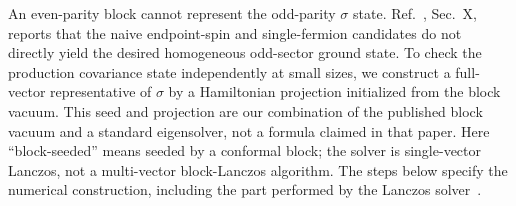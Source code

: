 \label{sec:sigmamethod}
An even-parity block cannot represent the odd-parity $\sigma$ state.
Ref.~\cite{Montes2017}, Sec.~X, reports that the naive endpoint-spin and
single-fermion candidates do not directly yield the desired homogeneous
odd-sector ground state. To check the production covariance state
independently at small sizes, we construct a full-vector representative
of $\sigma$ by a Hamiltonian projection initialized from the block vacuum.
This seed and projection are our combination of the published block
vacuum and a standard eigensolver, not a formula claimed in that paper.
Here ``block-seeded'' means seeded by a conformal block; the solver is
single-vector Lanczos, not a multi-vector block-Lanczos algorithm.
The steps below specify the numerical construction, including the part
performed by the Lanczos solver~\cite{ARPACK,ScipyEigsh}.

